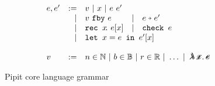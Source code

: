 
\begin{figure}
  \[
  \begin{array}{lrlll}
    e, e' & := & v ~|~ x ~|~ e~e' \\
          & | & \xfby{v}{e} & | & \xthen{e}{e'} \\
          & | & \xrec{x}{e[x]} & | & \xcheck{e} \\
          & | & \multicolumn{3}{l}{\xlet{x}{e}{e'[x]}} \\
    \\
    v & := & \multicolumn{3}{l}{n \in \mathbb{N} ~|~ b \in \mathbb{B} ~|~ r \in \mathbb{R} ~|~ \hdots ~|~ \mlamX} \\
    \end{array}
  \]
  \caption{Pipit core language grammar}
  \label{f:core-grammar}
\end{figure}